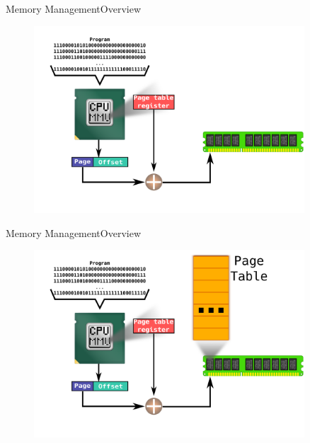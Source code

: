\documentclass[10pt]{beamer}
\begin{document}
\begin{frame}{Memory Management}{Overview}
  \begin{figure}[ht]
    \centering
    \includegraphics[width=0.9\textwidth, keepaspectratio=true]{images/mmu_c.png}
  \end{figure}
\end{frame}

\begin{frame}{Memory Management}{Overview}
  \begin{figure}[ht]
    \centering
    \includegraphics[width=0.9\textwidth, keepaspectratio=true]{images/mmu_d.png}
  \end{figure}
\end{frame}
\end{document}
